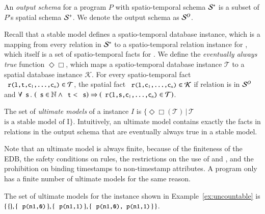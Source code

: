 An {\em output schema} for a \lang program $P$ with spatio-temporal schema
$\stschema$ is a subset of $P$'s spatial schema $\sschema$.  We denote the output schema as
$\oschema$.

Recall that a stable model defines a spatio-temporal database instance, which is a mapping from every relation  in $\stschema$ to a spatio-temporal relation instance for , which itself is a set of spatio-temporal facts for .  We define the {\em eventually always true} function $\Diamond\Box$, which maps a spatio-temporal database instance $\mathcal{T}$ to a spatial database instance $\mathcal{K}$.  For every spatio-temporal fact $\dedalus{r(l,t,c\sub{1},\ldots,c\sub{n})} \in \mathcal{T}$, the spatial fact $\dedalus{r(l,c\sub{1},\ldots,c\sub{n})} \in \mathcal{K}$ if relation  is in $\oschema$ and $\forall \dedalus{s}\, . \, \left(\dedalus{s} \in \mathbb{N} \land \dedalus{t} < \dedalus{s}\right) \Rightarrow \left(\dedalus{r(l,s,c\sub{1},\ldots,c\sub{n})} \in \mathcal{T}\right)$.

The set of {\em ultimate models} of a \lang instance $I$ is $\{\Diamond\Box(\mathcal{T}) \, | \, \mathcal{T}$  $\text{is a stable model of I}\}$.  Intuitively, an ultimate model contains exactly the facts in relations in the output schema that are eventually always true in a stable model.

Note that an ultimate model is always finite, because of the finiteness of the EDB, the safety conditions on rules, the restrictions on the use of  and , and the prohibition on binding timestamps to non-timestamp attributes.  A \lang program only has a finite number of ultimate models for the same reason.

\begin{example}
The set of ultimate models for the \lang instance shown in Example~\ref{ex:uncountable} is $\{ \, \{\}, \{ \, \dedalus{p(n1,0)} \, \}, \{ \, \dedalus{p(n1,1)} \, \}, \{ \, \dedalus{p(n1,0), p(n1,1)} \, \} \, \}$.
\end{example}



